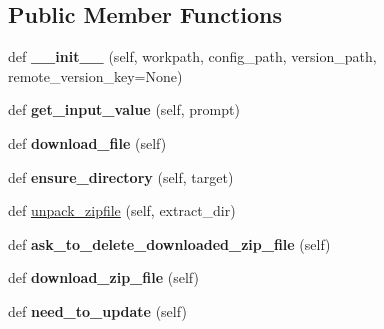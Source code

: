 \subsection*{Public Member Functions}
\begin{DoxyCompactItemize}
\item 
\mbox{\label{classdownload-deps_1_1CocosZipInstaller_af38fbad39d223d4ceb9e137a9fb2997b}} 
def {\bfseries \+\_\+\+\_\+init\+\_\+\+\_\+} (self, workpath, config\+\_\+path, version\+\_\+path, remote\+\_\+version\+\_\+key=None)
\item 
\mbox{\label{classdownload-deps_1_1CocosZipInstaller_a76346ec90b31eb239f733609d22c47eb}} 
def {\bfseries get\+\_\+input\+\_\+value} (self, prompt)
\item 
\mbox{\label{classdownload-deps_1_1CocosZipInstaller_a539dd9a014086e1eec02d3362b7f0683}} 
def {\bfseries download\+\_\+file} (self)
\item 
\mbox{\label{classdownload-deps_1_1CocosZipInstaller_ab201b9f5025ad593224e5bf2e775ab0e}} 
def {\bfseries ensure\+\_\+directory} (self, target)
\item 
def \hyperlink{classdownload-deps_1_1CocosZipInstaller_a93043957b5e9244249c31fd67636d3e6}{unpack\+\_\+zipfile} (self, extract\+\_\+dir)
\item 
\mbox{\label{classdownload-deps_1_1CocosZipInstaller_a3ba6607775d48adc18f14bf49063c466}} 
def {\bfseries ask\+\_\+to\+\_\+delete\+\_\+downloaded\+\_\+zip\+\_\+file} (self)
\item 
\mbox{\label{classdownload-deps_1_1CocosZipInstaller_a2a8254015676ccd8b3fb7b31d27e4a23}} 
def {\bfseries download\+\_\+zip\+\_\+file} (self)
\item 
\mbox{\label{classdownload-deps_1_1CocosZipInstaller_a8b8689321cb33939af201db41bb40135}} 
def {\bfseries need\+\_\+to\+\_\+update} (self)
\item 
\mbox{\label{classdownload-deps_1_1CocosZipInstaller_a96f1cf87391a76b4b15359ee3cb8e9f4}} 

\end{DoxyCompactItemize}
